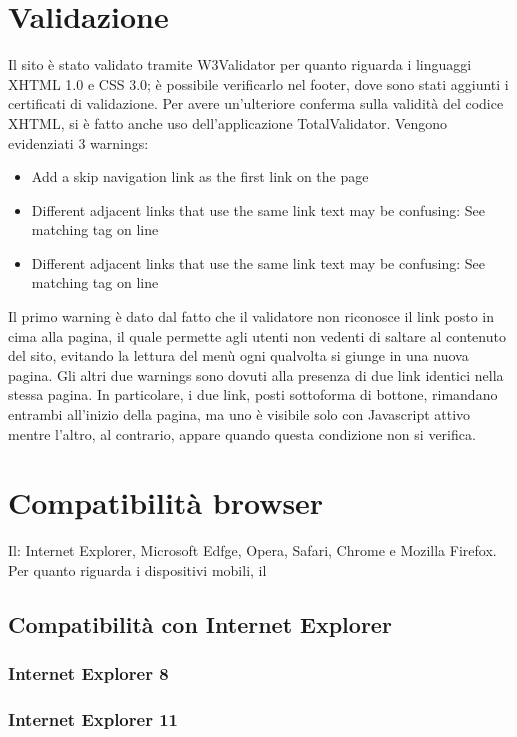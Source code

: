 \documentclass[10pt, a4paper]{article}
\begin{document}
\section{Validazione}
Il sito è stato validato tramite W3Validator per quanto riguarda i linguaggi XHTML 1.0 e CSS 3.0; è possibile verificarlo nel footer, dove sono stati aggiunti i certificati di validazione. Per avere un’ulteriore conferma sulla validità del codice XHTML, si è fatto anche uso dell’applicazione TotalValidator. Vengono evidenziati 3 warnings:
\begin{itemize}
\item{Add a skip navigation link as the first link on the page}
\item{Different adjacent links that use the same link text may be confusing: See matching tag on line}
\item{Different adjacent links that use the same link text may be confusing: See matching tag on line}
\end{itemize}
Il primo warning è dato dal fatto che il validatore non riconosce il link posto in cima alla pagina, il quale permette agli utenti non vedenti di saltare al contenuto del sito, evitando la lettura del menù ogni qualvolta si giunge in una nuova pagina. 
Gli altri due warnings sono dovuti alla presenza di due link identici nella stessa pagina. In particolare, i due link, posti sottoforma di bottone, rimandano entrambi all'inizio della pagina, ma uno è visibile solo con Javascript attivo mentre l'altro, al contrario, appare quando questa condizione non si verifica. 


\section{Compatibilità browser}
Il: Internet Explorer, Microsoft Edfge, Opera, Safari, Chrome e Mozilla Firefox.
Per quanto riguarda i dispositivi mobili, il
\subsection{Compatibilità con Internet Explorer}

\subsubsection{Internet Explorer 8}

\subsubsection{Internet Explorer 11}
\end{document}
